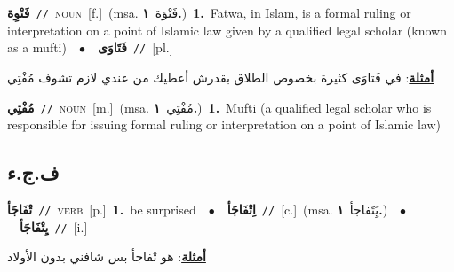 \documentclass[10pt,a4paper,twoside]{article} %
\begin{document}
\begin{multicols}{2}
{\setlength\topsep{0pt}\textbf{\foreignlanguage{arabic}{فَتْوِة}}\ {\color{gray}\texttt{//}\color{black}}\ \textsc{noun}\ [f.]\ \color{gray}(msa. \foreignlanguage{arabic}{فَتْوَة}~\foreignlanguage{arabic}{\textbf{١.}})\color{black}\ \textbf{1.}~Fatwa, in Islam, is a formal ruling or interpretation on a point of Islamic law given by a qualified legal scholar (known as a mufti)\ \ $\bullet$\ \ \setlength\topsep{0pt}\textbf{\foreignlanguage{arabic}{فَتَاوَى}}\ {\color{gray}\texttt{//}\color{black}}\ [pl.]\  \begin{flushright}\color{gray}\foreignlanguage{arabic}{\textbf{\underline{\foreignlanguage{arabic}{أمثلة}}}: في فَتاوَى كثيرة بخصوص الطلاق بقدرش أعطيك من عندي لازم تشوف مُفْتِي}\end{flushright}\color{black}} \vspace{2mm}

{\setlength\topsep{0pt}\textbf{\foreignlanguage{arabic}{مُفْتِي}}\ {\color{gray}\texttt{//}\color{black}}\ \textsc{noun}\ [m.]\ \color{gray}(msa. \foreignlanguage{arabic}{مُفْتِي}~\foreignlanguage{arabic}{\textbf{١.}})\color{black}\ \textbf{1.}~Mufti (a qualified legal scholar who is responsible for issuing formal ruling or interpretation on a point of Islamic law)\ } \vspace{2mm}

\vspace{-3mm}
\subsection*{\color{blue}\foreignlanguage{arabic}{ف.ج.ء}\color{blue}{}} 

{\setlength\topsep{0pt}\textbf{\foreignlanguage{arabic}{تْفَاجَأ}}\ {\color{gray}\texttt{//}\color{black}}\ \textsc{verb}\ [p.]\ \textbf{1.}~be surprised\ \ $\bullet$\ \ \setlength\topsep{0pt}\textbf{\foreignlanguage{arabic}{اِتْفَاجَأ}}\ {\color{gray}\texttt{//}\color{black}}\ [c.]\ \color{gray}(msa. \foreignlanguage{arabic}{يَِتَفاجأ}~\foreignlanguage{arabic}{\textbf{١.}})\color{black}\ \ $\bullet$\ \ \setlength\topsep{0pt}\textbf{\foreignlanguage{arabic}{يِتْفَاجَأ}}\ {\color{gray}\texttt{//}\color{black}}\ [i.]\  \begin{flushright}\color{gray}\foreignlanguage{arabic}{\textbf{\underline{\foreignlanguage{arabic}{أمثلة}}}: هو تْفاجأ بس شافني بدون الأولاد}\end{flushright}\color{black}} \vspace{2mm}


\end{multicols}
\end{document}
